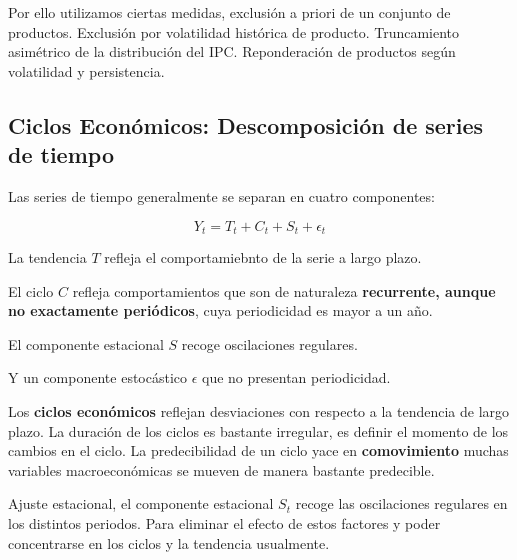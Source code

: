 Por ello utilizamos ciertas medidas, exclusión a priori de un conjunto de productos. Exclusión por volatilidad histórica de producto. Truncamiento asimétrico de la distribución del IPC. Reponderación de productos según volatilidad y persistencia.

\subsection{Ciclos Económicos: Descomposición de series de tiempo}

Las series de tiempo generalmente se separan en cuatro componentes:

\begin{equation}
    Y_{t}=T_{t}+C_{t} +S_{t} +\epsilon_{t}
\end{equation}


La tendencia $T$ refleja el comportamiebnto de la serie a largo plazo.

El ciclo $C$ refleja comportamientos que son de naturaleza \textbf{recurrente, aunque no exactamente periódicos}, cuya periodicidad es mayor a un año.

El componente estacional $S$ recoge oscilaciones regulares.

Y un componente estocástico $\epsilon$ que no presentan periodicidad.

\begin{definition}
Los \textbf{ciclos económicos} reflejan desviaciones con respecto a la tendencia de largo plazo. La duración de los ciclos es bastante irregular, es definir el momento de los cambios en el ciclo. La predecibilidad de un ciclo yace en \textbf{comovimiento} muchas variables macroeconómicas se mueven de manera bastante predecible.
\end{definition}

Ajuste estacional, el componente estacional $S_{t}$ recoge las oscilaciones regulares en los distintos periodos. Para eliminar el efecto de estos factores y poder concentrarse en los ciclos y la tendencia usualmente. 